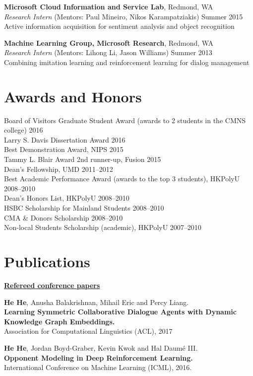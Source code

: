 \documentclass[margin,line]{resume}
\begin{document}
\begin{resume}
{\bf Microsoft Cloud Information and Service Lab}, Redmond, WA\\
\emph{Research Intern} (Mentors: Paul Mineiro, Nikos Karampatziakis) \hfill Summer 2015\\
Active information acquisition for sentiment analysis and object recognition 

{\bf Machine Learning Group, Microsoft Research}, Redmond, WA\\
\emph{Research Intern} (Mentors: Lihong Li, Jason Williams) \hfill Summer 2013\\
Combining imitation learning and reinforcement learning for dialog management 

\section{\sc Awards and Honors}
Board of Visitors Graduate Student Award (awards to 2 students in the CMNS college) \hfill 2016\\
Larry S. Davis Dissertation Award \hfill 2016\\
Best Demonstration Award, NIPS \hfill 2015\\
Tammy L. Blair Award 2nd runner-up, Fusion \hfill 2015\\
Dean's Fellowship, UMD \hfill 2011--2012 \\
Best Academic Performance Award (awards to the top 3 students), HKPolyU \hfill 2008--2010\\
Dean's Honors List, HKPolyU \hfill 2008--2010\\
HSBC Scholarship for Mainland Students \hfill 2008--2010\\
CMA \& Donors Scholarship \hfill 2008--2010\\
Non-local Students Scholarship (academic), HKPolyU \hfill 2007--2010\\

\section{\sc Publications}
{\bf\underline{Refereed conference papers}}

{\bf He He}, Anusha Balakrishnan, Mihail Eric and Percy Liang.\\
{\bf Learning Symmetric Collaborative Dialogue Agents with Dynamic Knowledge Graph Embeddings.}\\
Association for Computational Linguistics (ACL), 2017

{\bf He He}, Jordan Boyd-Graber, Kevin Kwok and Hal Daum\'e III.\\
{\bf Opponent Modeling in Deep Reinforcement Learning.}\\
International Conference on Machine Learning (ICML), 2016.


\end{resume}
\end{document}
